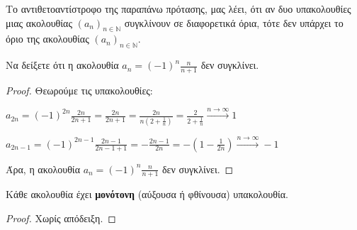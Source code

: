 \documentclass[a4paper,table]{report}
\begin{document}
\begin{rem}
  Το αντιθετοαντίστροφο της παραπάνω πρότασης, μας λέει, ότι αν δυο 
  υπακολουθίες μιας ακολουθίας $ (a_{n})_{n \in \mathbb{N}} $ συγκλίνουν σε 
  διαφορετικά όρια, τότε δεν υπάρχει το όριο της ακολουθίας 
  $ (a_{n})_{n \in \mathbb{N}} $.
\end{rem}

\begin{example}
  Να δείξετε ότι η ακολουθία $ a_{n} = (-1)^{n}\frac{n}{n+1} $ δεν συγκλίνει. 
\end{example}

\begin{proof}
\item {}
  Θεωρούμε τις υπακολουθίες:
  \begin{myitemize}[labelindent=1em]
    \item $ a_{2n} = (-1)^{2n} \frac{2n}{2n+1} = \frac{2n}{2n+1} = \frac{2n}{n(2+
      \frac{1}{n})} = \frac{2}{2+ \frac{1}{n}} \xrightarrow{n \to \infty} 1 $
    \item $ a_{2n-1} = (-1)^{2n-1} \frac{2n-1}{2n-1+1} = -\frac{2n-1}{2n} = 
      -\left(1 - \frac{1}{2n}\right) \xrightarrow{n \to \infty} -1  $
  \end{myitemize}
  Άρα, η ακολουθία $ a_{n}= (-1)^{n} \frac{n}{n+1} $ δεν συγκλίνει.
\end{proof}


\begin{mybox3}
  \begin{prop}
    \label{prop:monoton}
    Κάθε ακολουθία έχει \textbf{μονότονη} (αύξουσα ή φθίνουσα) υπακολουθία.
  \end{prop}
\end{mybox3}
\begin{proof}
  Χωρίς απόδειξη.
\end{proof}
\end{document}

